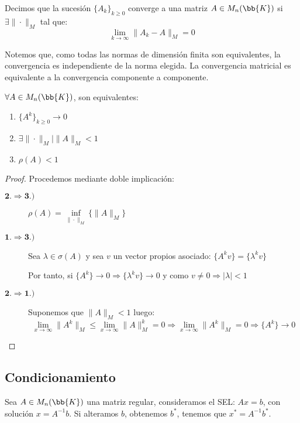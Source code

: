 \begin{definicion}
    Decimos que la sucesión $\{A_k\}_{k \geq 0}$ converge a una matriz $A \in M_n(\bb{K})$ si $\exists \|\cdot\|_M$ tal que:
    $$\lim_{k\to \infty} \|A_k - A\|_M = 0$$
\end{definicion}

Notemos que, como todas las normas de dimensión finita son equivalentes, la convergencia es independiente de la norma elegida.
La convergencia matricial es equivalente a la convergencia componente a componente.

\begin{prop}
    $\forall A \in M_n(\bb{K})$, son equivalentes:
    \begin{enumerate}
        \item $\{A^k\}_{k \geq 0} \rightarrow 0$
        \item $\exists \|\cdot\|_M \mid \|A\|_M < 1$
        \item $\rho(A)<1$
    \end{enumerate}
\end{prop}
\begin{proof} Procedemos mediante doble implicación:

    \begin{description}
        \item [$\mathbf{2. \Longrightarrow 3.)}$] $\rho(A) = \inf\limits_{\|\cdot\|_M}\{\|A\|_M\}$
        
        \item [$\mathbf{1. \Longrightarrow 3.)}$] Sea $\lambda \in \sigma(A)$ y sea $v$ un vector propios asociado: $\{A^kv\}=\{\lambda^kv\}$
    
        Por tanto, si $\{A^k\}\rightarrow 0 \Rightarrow \{\lambda^kv\} \rightarrow 0$ y como $v \neq 0 \Rightarrow |\lambda|<1$
        \item [$\mathbf{2. \Longrightarrow 1.)}$]
            Suponemos que $\|A\|_M < 1$ luego:
        $$\lim_{x \to \infty}\|A^k\|_M \leq \lim_{x \to \infty}\|A\|^k_M = 0 \Rightarrow \lim_{x \to \infty}\|A^k\|_M = 0 \Rightarrow
            \{A^k\} \rightarrow 0$$
    \end{description}
\end{proof}

\subsection{Condicionamiento}
\noindent
Sea $A \in M_n(\bb{K})$ una matriz regular, consideramos el SEL: $Ax=b$, con solución $x=A^{-1}b$.
Si alteramos $b$, obtenemos $b^{*}$, tenemos que $x^{*}=A^{-1}b^{*}$.

